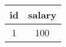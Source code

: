 \begin{tabular}{|c|c|}
    \hline
        \textbf{id} & \textbf{salary} \\ \hline
        1 & 100 \\ \hline
\end{tabular}
